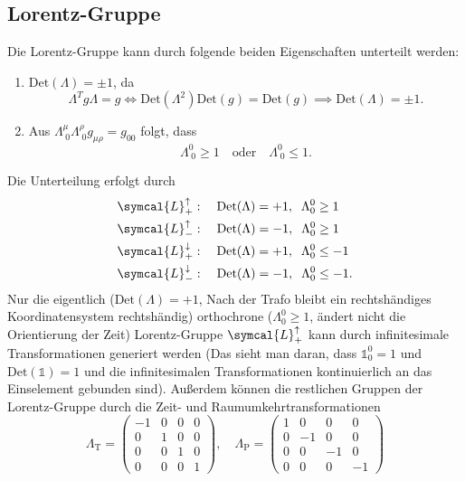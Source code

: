 \documentclass[
  captions=tableheading,  %
  titlepage=firstiscover, %
]{scrartcl}
\begin{document}
\subsection{Lorentz-Gruppe}
Die Lorentz-Gruppe kann durch folgende beiden Eigenschaften unterteilt werden:
\begin{enumerate}
  \item$\text{Det}(\Lambda) = \pm 1$, da 
  \begin{equation*}
    \Lambda^T g \Lambda = g \iff \text{Det}(\Lambda^2) \text{Det}(g) = \text{Det}(g) \implies 
    \text{Det}(\Lambda) = \pm 1.
  \end{equation*}
  \item Aus $\Lambda_{\; 0}^{\mu} \Lambda_{\; 0}^{\rho} g_{\mu \rho} = g_{0 0}$ folgt, dass 
  \begin{equation*}
    \Lambda_{\; 0}^{0} \geq 1 \quad \text{oder} \quad \Lambda_{\; 0}^{0} \leq 1 .
  \end{equation*}
\end{enumerate}
Die Unterteilung erfolgt durch 
\begin{align*}
  & \symcal{L}_+^{\uparrow}:    \quad \text{Det}(\Lambda) = +1, \; \;  \Lambda_0^0 \geq 1 \\
  & \symcal{L}_-^{\uparrow}:    \quad \text{Det}(\Lambda) = -1, \; \;  \Lambda_0^0 \geq 1 \\
  & \symcal{L}_+^{\downarrow}:  \quad \text{Det}(\Lambda) = +1, \; \;  \Lambda_0^0 \leq -1 \\
  & \symcal{L}_-^{\downarrow}:  \quad \text{Det}(\Lambda) = -1, \; \;  \Lambda_0^0 \leq -1 .
\end{align*}
Nur die eigentlich ($\text{Det}(\Lambda) = +1$, Nach der Trafo bleibt ein rechtshändiges Koordinatensystem rechtshändig) 
orthochrone ($\Lambda_0^0 \geq 1$, ändert nicht die Orientierung der Zeit) 
Lorentz-Gruppe $\symcal{L}_+^{\uparrow}$ kann durch infinitesimale Transformationen 
generiert werden (Das sieht man daran, dass $\mathbb{1}_0^0 = 1$ und $\text{Det}(\mathbb{1}) = 1$ und die 
infinitesimalen Transformationen kontinuierlich an das Einselement gebunden sind).
Außerdem können die restlichen Gruppen der Lorentz-Gruppe durch die Zeit- und Raumumkehrtransformationen 
\begin{equation*}
  \Lambda_{\text{T}} = 
  \begin{pmatrix}
    -1  & 0   & 0   & 0 \\
    0   & 1   & 0   & 0 \\
    0   & 0   & 1   & 0 \\
    0   & 0   & 0   & 1 
  \end{pmatrix} , \quad
  \Lambda_{\text{P}} = 
  \begin{pmatrix}
    1 & 0   & 0   & 0 \\
    0 & -1  & 0   & 0 \\
    0 & 0   & -1  & 0 \\
    0 & 0   & 0   & -1 
  \end{pmatrix}
\end{equation*}
\end{document}
